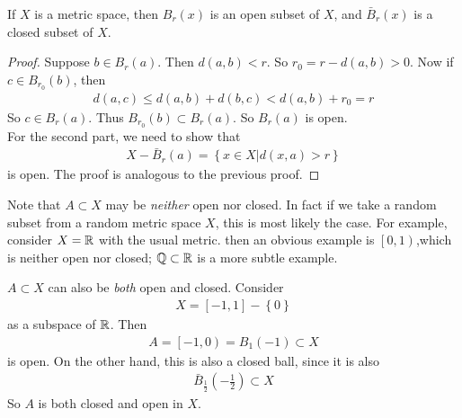 \documentclass[a4paper]{article}
\begin{document}
\begin{prop}
If $X$ is a metric space, then $B_r\left(x\right)$ is an open subset of $X$, and $\bar{B}_r\left(x\right)$ is a closed subset of $X$.
\begin{proof}
Suppose $b\in B_r\left(a\right)$. Then $d\left(a,b\right) < r$. So $r_0 = r-d\left(a,b\right)>0$. Now if $c\in B_{r_0}\left(b\right)$, then
\begin{equation*}
\begin{aligned}
d\left(a,c\right) \leq d\left(a,b\right)+d\left(b,c\right)<d\left(a,b\right)+r_0=r
\end{aligned}
\end{equation*}
So $c\in B_r\left(a\right)$. Thus $B_{r_0}\left(b\right) \subset B_r\left(a\right)$. So $B_r\left(a\right)$ is open.\\
For the second part, we need to show that
\begin{equation*}
\begin{aligned}
X-\bar{B}_r\left(a\right) = \left\{ x\in X | d\left(x,a\right)>r\right\}
\end{aligned}
\end{equation*}
is open. The proof is analogous to the previous proof.
\end{proof}
\end{prop}

\begin{rem}
Note that $A\subset X$ may be \emph{neither} open nor closed. In fact if we take a random subset from a random metric space $X$, this is most likely the case. For example, consider $X=\mathbb{R}$ with the usual metric. then an obvious example is $\left[0,1\right)$,which is neither open nor closed; $\mathbb{Q} \subset \mathbb{R}$ is a more subtle example.
\end{rem}

\begin{rem}
$A\subset X$ can also be \emph{both} open and closed. Consider
\begin{equation*}
\begin{aligned}
X=\left[-1,1\right]-\left\{0\right\}
\end{aligned}
\end{equation*}
as a subspace of $\mathbb{R}$. Then
\begin{equation*}
\begin{aligned}
A=\left[-1,0\right)=B_1\left(-1\right) \subset X
\end{aligned}
\end{equation*}
is open. On the other hand, this is also a closed ball, since it is also
\begin{equation*}
\begin{aligned}
\bar{B}_{\frac{1}{2}} \left(-\frac{1}{2}\right) \subset X
\end{aligned}
\end{equation*}
So $A$ is both closed and open in $X$.
\end{rem}
\end{document}
